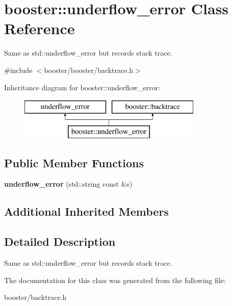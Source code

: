 \section{booster\+:\+:underflow\+\_\+error Class Reference}
\label{classbooster_1_1underflow__error}


Same as std\+::underflow\+\_\+error but records stack trace.  




{\ttfamily \#include $<$booster/booster/backtrace.\+h$>$}

Inheritance diagram for booster\+:\+:underflow\+\_\+error\+:\begin{figure}[H]
\begin{center}
\leavevmode
\includegraphics[height=2.000000cm]{classbooster_1_1underflow__error}
\end{center}
\end{figure}
\subsection*{Public Member Functions}
\begin{DoxyCompactItemize}
\item 
{\bfseries underflow\+\_\+error} (std\+::string const \&s)\label{classbooster_1_1underflow__error_ac5ae1a55ac50a0e55af0f6610c4d8dc1}

\end{DoxyCompactItemize}
\subsection*{Additional Inherited Members}


\subsection{Detailed Description}
Same as std\+::underflow\+\_\+error but records stack trace. 

The documentation for this class was generated from the following file\+:\begin{DoxyCompactItemize}
\item 
booster/backtrace.\+h\end{DoxyCompactItemize}

